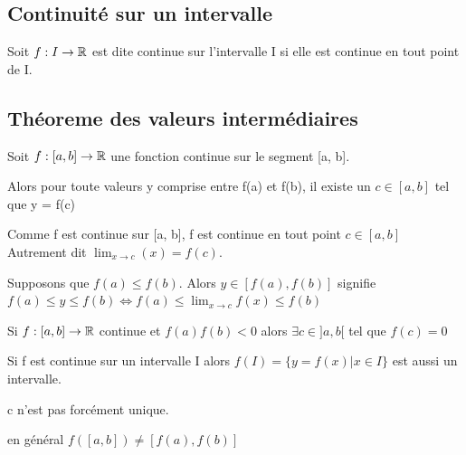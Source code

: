 \documentclass[a4paper, 12pt]{article}
\begin{document}
\subsection{Continuité sur un intervalle}

\begin{definition}
    Soit $f: I \rightarrow \mathbb{R}$ est dite continue sur l'intervalle I si elle est continue en
    tout point de I.
\end{definition}

\subsection{Théoreme des valeurs intermédiaires}

\begin{theorem}
    Soit $f: [a, b] \rightarrow \mathbb{R}$ une fonction continue sur le segment [a, b].

    Alors pour toute valeurs y comprise entre f(a) et f(b), il existe un $c \in [a, b]$ tel que y = f(c)
\end{theorem}

\begin{demonstration}
    Comme f est continue sur [a, b], f est continue en tout point $c \in [a, b]$
    Autrement dit $\lim_{x \to c}(x) = f(c)$.

    Supposons que $f(a) \leq f(b)$. Alors $y \in [f(a), f(b)]$ signifie $f(a) \leq y \leq f(b) \iff f(a) \leq \lim_{x \to c}f(x) \leq f(b)$
\end{demonstration}

\begin{corollaire}
    Si $f: [a, b] \rightarrow \mathbb{R}$ continue et $f(a)f(b) \lt 0$ alors $\exists c \in ]a, b[$ tel que $f(c) = 0$
\end{corollaire}

\begin{corollaire}
    Si f est continue sur un intervalle I alors $f(I) = \{y = f(x) | x \in I\}$ est aussi un intervalle.
\end{corollaire}

\begin{remark}
    \item c n'est pas forcément unique.
    \item en général $f([a, b]) \neq [f(a), f(b)]$
\end{remark}



\end{document}
